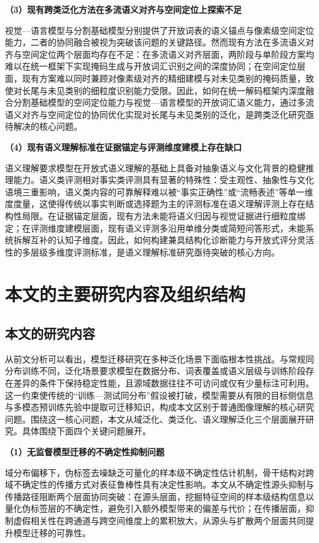 \noindent\textbf{（3）现有跨类泛化方法在多流语义对齐与空间定位上探索不足}

视觉—语言模型与分割基础模型分别提供了开放词表的语义锚点与像素级空间定位能力，二者的协同融合被视为突破该问题的关键路径。然而现有方法在多流语义对齐与空间定位两个层面均存在不足：在多流语义对齐层面，两阶段与单阶段方案均难以在统一框架下实现掩码生成与开放词汇识别之间的深度协同；在空间定位层面，现有方案难以同时兼顾对像素级对齐的精细建模与对未见类别的掩码质量，致使对长尾与未见类别的细粒度识别能力受限。因此，如何在统一解码框架内深度融合分割基础模型的空间定位能力与视觉—语言模型的开放词汇语义能力，通过多流语义对齐与空间定位的协同优化实现对长尾与未见类别的泛化，是跨类泛化研究亟待解决的核心问题。

\noindent\textbf{（4）现有语义理解标准在证据锚定与评测维度建模上存在缺口}

语义理解要求模型在开放式语义理解的基础上具备对抽象语义与文化背景的稳健推理能力。语义类评测相对事实类评测具有显著的特殊性：受主观性、抽象性与文化语境三重影响，语义类内容的可靠解释难以被“事实正确性”或“流畅表述”等单一维度度量，这使得传统以事实判断或选择题为主的评测标准在语义理解评测上存在结构性局限。在证据锚定层面，现有方法未能将语义归因与视觉证据进行细粒度绑定；在评测维度建模层面，现有语义评测多沿用单维分类或简短问答形式，未能系统拆解互补的认知子维度。因此，如何构建兼具结构化诊断能力与开放式评分灵活性的多层级多维度评测标准，是语义理解标准研究亟待突破的核心方向。

\section{本文的主要研究内容及组织结构}

\subsection{本文的研究内容}

从前文分析可以看出，模型迁移研究在多种泛化场景下面临根本性挑战。与常规同分布训练不同，泛化场景要求模型在数据分布、词表覆盖或语义层级与训练阶段存在差异的条件下保持稳定性能，且源域数据往往不可访问或仅有少量标注可利用。这一约束使传统的“训练—测试同分布”假设被打破，模型需要从有限的目标侧信息与多模态预训练先验中提取可迁移知识，构成本文区别于普通图像理解的核心研究问题。围绕这一核心问题，本文从域泛化、类泛化、语义理解泛化三个层面展开研究。具体围绕下面四个关键问题展开。


\noindent\textbf{（1）无监督模型迁移的不确定性抑制问题}

域分布偏移下，伪标签去噪缺乏可量化的样本级不确定性估计机制，骨干结构对跨域不确定性的传播方式对表征鲁棒性具有决定性影响。本文从不确定性源头抑制与传播路径阻断两个层面协同突破：在源头层面，挖掘特征空间的样本级结构信息以量化伪标签层的不确定性，避免引入额外模型带来的偏差与代价；在传播层面，抑制虚假相关性在跨通道与跨空间维度上的累积放大，从源头与扩散两个层面共同提升模型迁移的可靠性。

